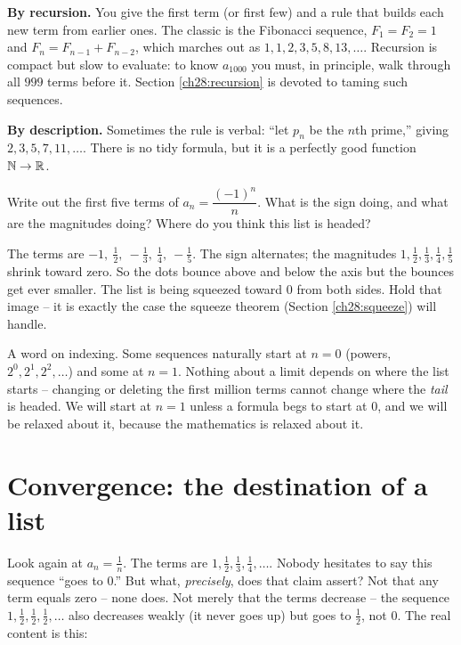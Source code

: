 \textbf{By recursion.} You give the first term (or first few) and a rule that
builds each new term from earlier ones. The classic is the Fibonacci sequence,
$F_1 = F_2 = 1$ and $F_{n} = F_{n-1} + F_{n-2}$, which marches out as $1, 1, 2,
3, 5, 8, 13, \dots$. Recursion is compact but slow to evaluate: to know $a_{1000}$ you
must, in principle, walk through all $999$ terms before it. Section
\ref{ch28:recursion} is devoted to taming such sequences.

\textbf{By description.} Sometimes the rule is verbal: ``let $p_n$ be the $n$th
prime,'' giving $2, 3, 5, 7, 11, \dots$. There is no tidy formula, but it is a
perfectly good function $\mathbb{N} \to \mathbb{R}$.

\begin{walkbox}
Write out the first five terms of $a_n = \dfrac{(-1)^n}{n}$. What is the sign
doing, and what are the magnitudes doing? Where do you think this list is
headed?

\smallskip
The terms are $-1,\ \tfrac12,\ -\tfrac13,\ \tfrac14,\ -\tfrac15$. The sign
alternates; the magnitudes $1, \tfrac12, \tfrac13, \tfrac14, \tfrac15$ shrink
toward zero. So the dots bounce above and below the axis but the bounces get
ever smaller. The list is being squeezed toward $0$ from both sides. Hold that
image -- it is exactly the case the squeeze theorem (Section \ref{ch28:squeeze})
will handle.
\end{walkbox}

\begin{marginnotebox}
A word on indexing. Some sequences naturally start at $n=0$ (powers, $2^0,
2^1, 2^2, \dots$) and some at $n=1$. Nothing about a limit depends on where the
list starts -- changing or deleting the first million terms cannot change where
the \emph{tail} is headed. We will start at $n=1$ unless a formula begs to start
at $0$, and we will be relaxed about it, because the mathematics is relaxed about
it.
\end{marginnotebox}

\section{Convergence: the destination of a list}
\label{ch28:convergence}

Look again at $a_n = \tfrac1n$. The terms are $1, \tfrac12, \tfrac13, \tfrac14,
\dots$. Nobody hesitates to say this sequence ``goes to $0$.'' But what,
\emph{precisely}, does that claim assert? Not that any term equals zero -- none
does. Not merely that the terms decrease -- the sequence $1, \tfrac12, \tfrac12,
\tfrac12, \dots$ also decreases weakly (it never goes up) but goes to $\tfrac12$, not $0$. The
real content is this:

